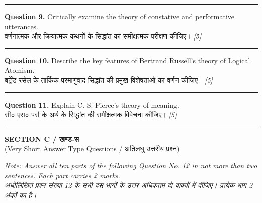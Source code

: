\documentclass[11pt,a4paper]{article}
\newcommand{\pts}[1]{\hfill \textit{[#1]}}
\begin{document}
\medskip\rule{\linewidth}{0.2pt}\medskip

\noindent \textbf{Question 9.} Critically examine the theory of constative and performative utterances.\\[1pt]
वर्णनात्मक और क्रियात्मक कथनों के सिद्धांत का समीक्षत्मक परीक्षण कीजिए। \pts{5}

\medskip\rule{\linewidth}{0.2pt}\medskip

\noindent \textbf{Question 10.} Describe the key features of Bertrand Russell's theory of Logical Atomism.\\[1pt]
बर्ट्रेंड रसेल के तार्किक परमाणुवाद सिद्धांत की प्रमुख विशेषताओं का वर्णन कीजिए। \pts{5}

\medskip\rule{\linewidth}{0.2pt}\medskip

\noindent \textbf{Question 11.} Explain C. S. Pierce's theory of meaning.\\[1pt]
सी० एस० पर्स के अर्थ के सिद्धांत की समीक्षत्मक विवेचना कीजिए। \pts{5}

\bigskip
\rule{\linewidth}{0.2pt}
\bigskip

\begin{center}
  {\large\bfseries SECTION C / खण्ड-स}\\[2pt]
  {\normalsize (Very Short Answer Type Questions / अतिलघु उत्तरीय प्रश्न)}
\end{center}

\noindent \textit{Note: Answer all ten parts of the following Question No. 12 in not more than two sentences. Each part carries 2 marks.}\\[2pt]
\noindent \textit{अधोलिखित प्रश्न संख्या 12 के सभी दस भागों के उत्तर अधिकतम दो वाक्यों में दीजिए। प्रत्येक भाग 2 अंकों का है।}

\bigskip
\end{document}
